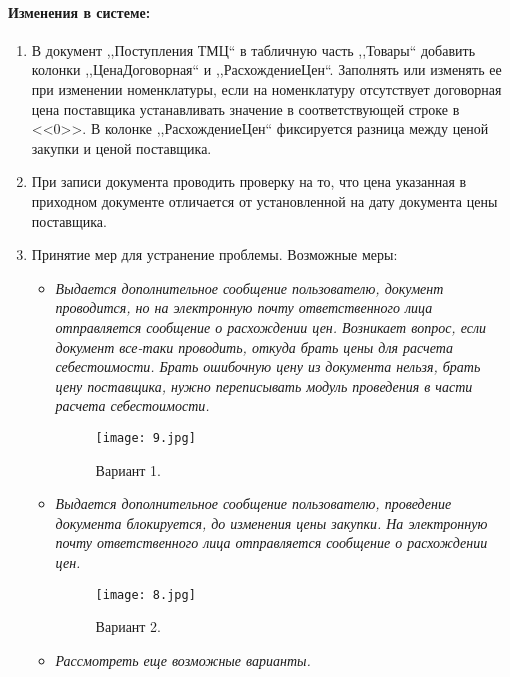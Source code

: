 \paragraph{Изменения в системе:}
\begin{enumerate}	
	\item В документ ,,Поступления ТМЦ`` в табличную часть ,,Товары`` добавить колонки ,,ЦенаДоговорная`` и ,,РасхождениеЦен``. Заполнять или изменять ее при изменении номенклатуры, если на номенклатуру отсутствует договорная цена поставщика устанавливать значение в соответствующей строке в <<0>>.
	В колонке ,,РасхождениеЦен`` фиксируется разница между ценой закупки и ценой поставщика.
	
	\item При записи документа проводить проверку на то, что цена указанная в приходном документе отличается от установленной на дату документа цены поставщика.
	\item Принятие мер для устранение проблемы. Возможные меры: 
	\begin{itemize}	
			\item \textit{Выдается дополнительное сообщение пользователю, документ проводится, но на электронную почту ответственного лица отправляется сообщение о расхождении цен. Возникает вопрос, если документ все-таки проводить, откуда брать цены для расчета себестоимости. Брать ошибочную цену из документа нельзя, брать цену поставщика, нужно переписывать модуль проведения в части расчета себестоимости.}
		\begin{figure}[H]
			\texttt{[image: 9.jpg]}
			\caption{Вариант 1.}
			\label{ris:9.jpg}
		\end{figure}		
			\item \textit{Выдается дополнительное сообщение пользователю, проведение документа блокируется, до изменения цены закупки. На электронную почту ответственного лица отправляется сообщение о расхождении цен. }
		\begin{figure}[H]
			\texttt{[image: 8.jpg]}
			\caption{Вариант 2.}
			\label{ris:8.jpg}
		\end{figure}		
		\item \textit{Рассмотреть еще возможные варианты.}
	\end{itemize}
\end{enumerate}
